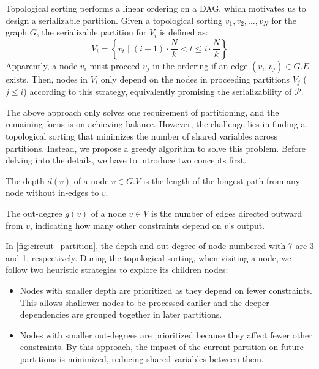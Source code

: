 Topological sorting performs a linear ordering on a DAG, which motivates us to design a serializable partition. Given a topological sorting $ v_1, v_2, \dots, v_N$ for the graph $G$, the serializable partition for $V_i$ is defined as: 
$$V_i = \left\{ v_t \mid (i-1) \cdot \frac{N}{k} < t \leq i \cdot \frac{N}{k} \right\}$$
Apparently, a node $v_i$ must proceed $v_j$ in the ordering if an edge $(v_i, v_j) \in G.E$ exists. Then, nodes in $V_i$ only depend on the nodes in proceeding partitions $V_j$ ($j\le i$) according to this strategy, equivalently promising the serializability of $\mathcal{P}$. 


The above approach only solves one requirement of partitioning, and the remaining focus is on achieving balance. However,  the challenge lies in finding a topological sorting that minimizes the number of shared variables across partitions. Instead, we propose a greedy algorithm to solve this problem. Before delving into the details, we have to introduce two concepts first.

\begin{definition}[Depth]
The depth $d(v)$ of a node $v \in G.V$ is the length of the longest path from any node without in-edges to $v$.
\end{definition}

\begin{definition}
The out-degree $g(v)$ of a node $v \in V$ is the number of edges directed outward from  $v$, indicating how many other constraints depend on $v$'s output.
\end{definition}
In \cref{fig:circuit_partition}, the depth and out-degree of node numbered with 7 are 3 and 1, respectively. During the topological sorting, when visiting a node, we follow two heuristic strategies to explore its children nodes:
\begin{itemize}[leftmargin=*]
    \item Nodes with smaller depth are prioritized as they depend on fewer constraints.  
    This allows shallower nodes to be processed earlier and the deeper dependencies are grouped together in later partitions.

    \item Nodes with smaller out-degrees are prioritized because they affect fewer other constraints. By this approach, the impact of the current partition on future partitions is minimized, reducing shared variables between them.
\end{itemize}



